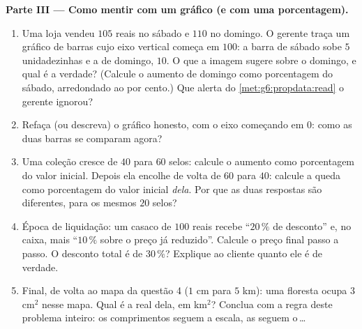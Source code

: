 \begin{problem}
\medskip
\noindent\textbf{Parte III --- Como mentir com um gráfico (e com uma
porcentagem).}
\begin{enumerate}[resume]
  \item Uma loja vendeu $105$ reais no sábado e $110$ no domingo. O
        gerente traça um gráfico de barras cujo eixo vertical começa em
        $100$: a barra de sábado sobe $5$ unidadezinhas e a de domingo,
        $10$. O que a imagem sugere sobre o domingo, e qual é a
        verdade? (Calcule o aumento de domingo como porcentagem do
        sábado, arredondado ao por cento.) Que alerta do
        \cref{met:g6:propdata:read} o gerente ignorou?
  \item Refaça (ou descreva) o gráfico honesto, com o eixo começando em
        $0$: como as duas barras se comparam agora?
  \item Uma coleção cresce de $40$ para $60$ selos: calcule o aumento
        como porcentagem do valor inicial. Depois ela encolhe de volta
        de $60$ para $40$: calcule a queda como porcentagem do valor
        inicial \emph{dela}. Por que as duas respostas são diferentes,
        para os mesmos $20$ selos?
  \item Época de liquidação: um casaco de $100$ reais recebe ``$20\,\%$
        de desconto'' e, no caixa, mais ``$10\,\%$ sobre o preço já
        reduzido''. Calcule o preço final passo a passo. O desconto
        total é de $30\,\%$? Explique ao cliente quanto ele é de
        verdade.
  \item Final, de volta ao mapa da questão 4 ($1$ cm para $5$ km): uma
        floresta ocupa $3$ cm$^2$ nesse mapa. Qual é a  real dela,
        em km$^2$? Conclua com a regra deste problema inteiro: os
        comprimentos seguem a escala, as  seguem o\,\dots
\end{enumerate}
\end{problem}
